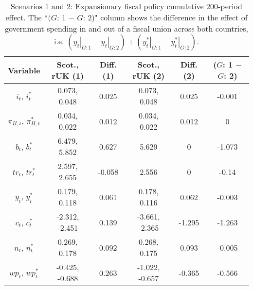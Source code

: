 \begin{table}[H]
\centering
\begin{tabular}{c|cc|cc|c}
  \hline
{\textbf{Variable}} & {\textbf{Scot., rUK (1)}} & {\textbf{Diff. (1)}} & {\textbf{Scot., rUK (2)}} & {\textbf{Diff. (2)}} & {\textbf{($G$: 1 $-$ $G$: 2)}} \\ 
  \hline
${i_t}$, ${i^*_t}$ & 0.073, 0.048 & 0.025 & 0.073, 0.048 & 0.025 & -0.001 \\ 
  ${\pi_{H,t}}$, ${\pi^*_{H,t}}$ & 0.034, 0.022 & 0.012 & 0.034, 0.022 & 0.012 & 0 \\ 
  ${b_t}$, ${b^*_t}$ & 6.479, 5.852 & 0.627 & 5.629 & 0 & -1.073 \\ 
  ${tr_t}$, ${tr^*_t}$ & 2.597, 2.655 & -0.058 & 2.556 & 0 & -0.14 \\ 
  ${y_t}$, ${y^*_t}$ & 0.179, 0.118 & 0.061 & 0.178, 0.116 & 0.062 & -0.003 \\ 
  ${c_t}$, ${c^*_t}$ & -2.312, -2.451 & 0.139 & -3.661, -2.365 & -1.295 & -1.263 \\ 
  ${n_t}$, ${n^*_t}$ & 0.269, 0.178 & 0.092 & 0.268, 0.175 & 0.093 & -0.005 \\ 
  ${wp_t}$, ${wp^*_t}$ & -0.425, -0.688 & 0.263 & -1.022, -0.657 & -0.365 & -0.566 \\ 
\end{tabular}
\vspace{0.5cm}
\caption{Scenarios 1 and 2: Expansionary fiscal policy cumulative 200-period effect. The ``$(G$: 1 $-$ $G$: 2)" column shows the difference in the effect of government spending in and out of a fiscal union across both countries, i.e. $(\left. y_t \right|_{G:1} - \left. y_t \right|_{G:2}) + (\left. y^*_t \right|_{G:1} - \left. y^*_t \right|_{G:2})$.} 
\label{table:responses_one_two}
\end{table}
